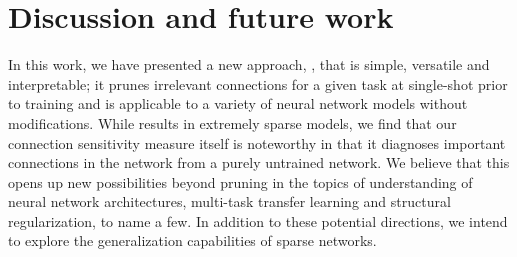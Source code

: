 \section{Discussion and future work}

In this work, we have presented a new approach, \snip{}, that is simple, versatile and interpretable; it prunes irrelevant connections for a given task at single-shot prior to training and is applicable to a variety of neural network models without modifications.
%
While \snip{} results in extremely sparse models, we find that our connection sensitivity measure itself is noteworthy in that it diagnoses important connections in the network from a purely untrained network.
%
We believe that this opens up new possibilities beyond pruning in the topics of understanding of neural network architectures, multi-task transfer learning and structural regularization, to name a few.   
%
In addition to these potential directions, we intend to explore the generalization capabilities of sparse networks.
